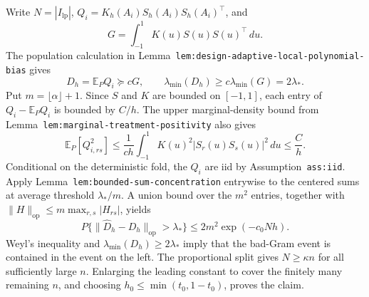 Write \(N=|I_{\mathrm{lp}}|\), \(Q_i=K_h(A_i)S_h(A_i)S_h(A_i)^\top\), and
\[
G=\int_{-1}^1K(u)S(u)S(u)^\top\,du.
\]
The population calculation in Lemma~\texttt{lem:design-adaptive-local-polynomial-bias} gives
\[
D_h=\mathbb E_PQ_i\succeq cG,
\qquad
\lambda_{\min}(D_h)\ge c\lambda_{\min}(G)=2\lambda_*.
\]
Put \(m=\lfloor\alpha\rfloor+1\). Since \(S\) and \(K\) are bounded on \([-1,1]\), each entry of \(Q_i-\mathbb E_PQ_i\) is bounded by \(C/h\). The upper marginal-density bound from Lemma~\texttt{lem:marginal-treatment-positivity} also gives
\[
\mathbb E_P[Q_{i,rs}^2]
\le \frac{1}{ch}\int_{-1}^1K(u)^2|S_r(u)S_s(u)|^2\,du
\le \frac Ch.
\]
Conditional on the deterministic fold, the \(Q_i\) are iid by Assumption~\texttt{ass:iid}. Apply Lemma~\texttt{lem:bounded-sum-concentration} entrywise to the centered sums at average threshold \(\lambda_*/m\). A union bound over the \(m^2\) entries, together with \(\|H\|_{\mathrm{op}}\le m\max_{r,s}|H_{rs}|\), yields
\[
P\{\|\widehat D_h-D_h\|_{\mathrm{op}}>\lambda_*\}
\le2m^2\exp(-c_0Nh).
\]
Weyl's inequality and \(\lambda_{\min}(D_h)\ge2\lambda_*\) imply that the bad-Gram event is contained in the event on the left. The proportional split gives \(N\ge\kappa n\) for all sufficiently large \(n\). Enlarging the leading constant to cover the finitely many remaining \(n\), and choosing \(h_0\le\min(t_0,1-t_0)\), proves the claim.